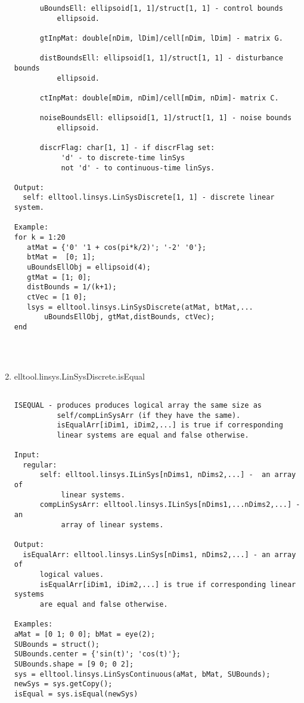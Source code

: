 \begin{enumerate}
\begin{lstlisting}
      uBoundsEll: ellipsoid[1, 1]/struct[1, 1] - control bounds
          ellipsoid.

      gtInpMat: double[nDim, lDim]/cell[nDim, lDim] - matrix G.

      distBoundsEll: ellipsoid[1, 1]/struct[1, 1] - disturbance bounds
          ellipsoid.

      ctInpMat: double[mDim, nDim]/cell[mDim, nDim]- matrix C.

      noiseBoundsEll: ellipsoid[1, 1]/struct[1, 1] - noise bounds
          ellipsoid.

      discrFlag: char[1, 1] - if discrFlag set:
           'd' - to discrete-time linSys
           not 'd' - to continuous-time linSys.

Output:
  self: elltool.linsys.LinSysDiscrete[1, 1] - discrete linear system.

Example:
for k = 1:20
   atMat = {'0' '1 + cos(pi*k/2)'; '-2' '0'};
   btMat =  [0; 1];
   uBoundsEllObj = ellipsoid(4);
   gtMat = [1; 0];
   distBounds = 1/(k+1);
   ctVec = [1 0];
   lsys = elltool.linsys.LinSysDiscrete(atMat, btMat,...
       uBoundsEllObj, gtMat,distBounds, ctVec);
end




\end{lstlisting}
\fontfamily{\familydefault}
\selectfont
\item {elltool.linsys.LinSysDiscrete.isEqual}
\selectfont
\begin{lstlisting}

ISEQUAL - produces produces logical array the same size as
          self/compLinSysArr (if they have the same).
          isEqualArr[iDim1, iDim2,...] is true if corresponding
          linear systems are equal and false otherwise.

Input:
  regular:
      self: elltool.linsys.ILinSys[nDims1, nDims2,...] -  an array of
           linear systems.
      compLinSysArr: elltool.linsys.ILinSys[nDims1,...nDims2,...] - an
           array of linear systems.

Output:
  isEqualArr: elltool.linsys.LinSys[nDims1, nDims2,...] - an array of
      logical values.
      isEqualArr[iDim1, iDim2,...] is true if corresponding linear systems
      are equal and false otherwise.

Examples:
aMat = [0 1; 0 0]; bMat = eye(2);
SUBounds = struct();
SUBounds.center = {'sin(t)'; 'cos(t)'};
SUBounds.shape = [9 0; 0 2];
sys = elltool.linsys.LinSysContinuous(aMat, bMat, SUBounds);
newSys = sys.getCopy();
isEqual = sys.isEqual(newSys)


\end{lstlisting}
\end{enumerate}
